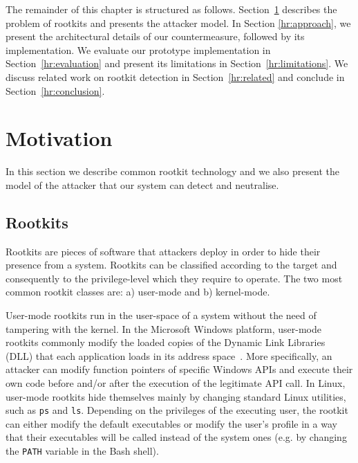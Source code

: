 
The remainder of this chapter is structured as follows. Section~\ref{hr:motivation} describes the problem of rootkits and presents the attacker model. In Section \ref{hr:approach}, we present the architectural details of our countermeasure, followed by its implementation.
We evaluate our prototype implementation in Section~\ref{hr:evaluation} and present its limitations in Section~\ref{hr:limitations}. We discuss related work on rootkit detection in Section~\ref{hr:related} and conclude in Section~\ref{hr:conclusion}.

\section{Motivation}\label{hr:motivation}
In this section we describe common rootkit technology and we also present the model of the attacker that our system can detect and neutralise.

\subsection{Rootkits}
Rootkits are pieces of software that attackers deploy in order to hide their presence from a system. Rootkits can be classified according to the target and consequently to the privilege-level which they require to operate. The two most common rootkit classes are: a) user-mode and b) kernel-mode.

User-mode rootkits run in the user-space of a system without the need of tampering with the kernel. In the Microsoft Windows platform, user-mode rootkits commonly modify the loaded copies of the Dynamic Link Libraries (DLL) that each application loads in its address space~\cite{SymantecRootkits}. 
More specifically, an attacker can modify function pointers of specific Windows APIs and execute their own code before and/or after the execution of the legitimate API call. In Linux, user-mode rootkits hide themselves mainly by changing standard Linux utilities, such as \texttt{ps} and \texttt{ls}. Depending on the privileges of the executing user, the rootkit can either modify the default executables or modify the user's profile in a way that their executables will be called instead of the system ones (e.g. by changing the \texttt{PATH} variable in the Bash shell).

